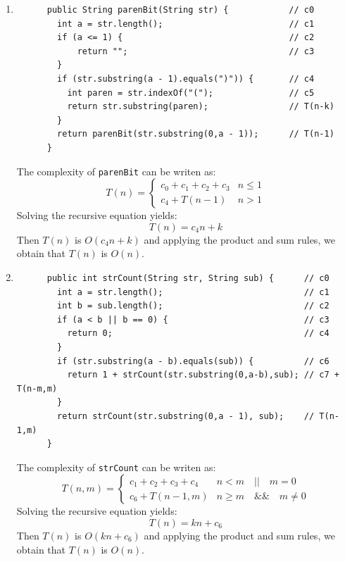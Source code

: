 \documentclass[a4paper,12pt]{article}
\begin{document}
\begin{enumerate}
      \item \begin{Verbatim}
      public String parenBit(String str) {            // c0
        int a = str.length();                         // c1
        if (a <= 1) {                                 // c2
            return "";                                // c3
        }
        if (str.substring(a - 1).equals(")")) {       // c4
          int paren = str.indexOf("(");               // c5
          return str.substring(paren);                // T(n-k)
        }
        return parenBit(str.substring(0,a - 1));      // T(n-1)
      }
      \end{Verbatim}
      The complexity of \texttt{parenBit} can be writen as:
      \begin{equation*}
        T\left( n \right)=\left\{\begin{array}{cc} c_{0}+c_{1}+c_{2}+c_{3} & n\leq 1 \\ c_{4}+T\left( n-1 \right) & n>1\end{array}\right.
      \end{equation*}
      Solving the recursive equation yields:
      \begin{equation*}
        T(n)=c_4n+k
      \end{equation*}
      Then $T(n)$ is $O(c_4n+k)$ and applying the product and sum rules, we obtain that $T(n)$ is $O(n)$.
      \item \begin{Verbatim}
      public int strCount(String str, String sub) {      // c0
        int a = str.length();                            // c1
        int b = sub.length();                            // c2
        if (a < b || b == 0) {                           // c3
          return 0;                                      // c4
        }
        if (str.substring(a - b).equals(sub)) {          // c6
          return 1 + strCount(str.substring(0,a-b),sub); // c7 + T(n-m,m)
        }
        return strCount(str.substring(0,a - 1), sub);    // T(n-1,m)
      }
      \end{Verbatim}
      The complexity of \texttt{strCount} can be writen as:
      \begin{equation*}
        T\left( n,m \right)=\left\{\begin{array}{cc} c_{1}+c_{2}+c_{3}+c_{4} & n<m\quad ||\quad m=0 \\ c_{6}+T\left( n-1,m \right) & n\geq m \quad\&\&\quad m\neq 0\end{array}\right.
      \end{equation*}
      Solving the recursive equation yields:
      \begin{equation*}
        T(n)=kn+c_6
      \end{equation*}
      Then $T(n)$ is $O(kn+c_6)$ and applying the product and sum rules, we obtain that $T(n)$ is $O(n)$.
    \end{enumerate}
\end{document}
